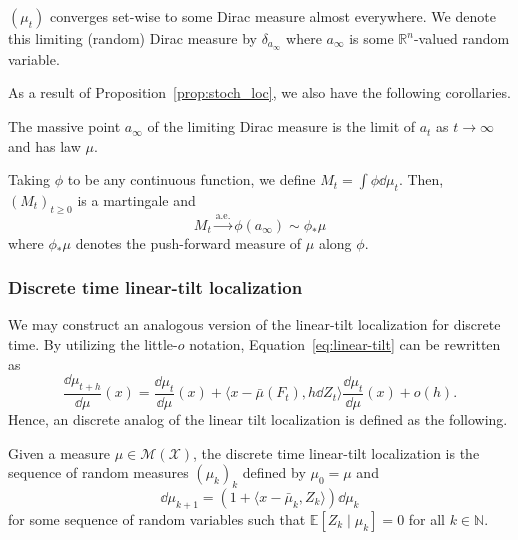 \begin{corollary}
  \((\mu_t)\) converges set-wise to some Dirac measure almost everywhere. We denote this 
  limiting (random) Dirac measure by \(\delta_{a_\infty}\) where \(a_\infty\) is some 
  \(\mathbb{R}^n\)-valued random variable.
\end{corollary}

As a result of Proposition~\ref{prop:stoch_loc}, we also have the following corollaries.

\begin{corollary}\label{cor:lim_dis}
  The massive point \(a_\infty\) of the limiting Dirac measure is the limit of \(a_t\) as 
  \(t \to \infty\) and has law \(\mu\).
\end{corollary}

\begin{corollary}\label{cor:lim_mart}
  Taking \(\phi\) to be any continuous function, we define \(M_t = \int \phi \dd\mu_t\). Then,
  \((M_t)_{t \ge 0}\) is a martingale and
  \begin{equation}\label{eq:lim_mart}
    M_t \xrightarrow{\text{a.e.}} \phi(a_\infty) \sim \phi_* \mu
  \end{equation}
  where \(\phi_*\mu\) denotes the push-forward measure of \(\mu\) along \(\phi\).
\end{corollary}

\subsubsection{Discrete time linear-tilt localization}\label{sec:discrete_tilt}

We may construct an analogous version of the linear-tilt localization for discrete time. By utilizing 
the little-\(o\) notation, Equation~\eqref{eq:linear-tilt} can be rewritten as 
\[\frac{\dd \mu_{t + h}}{\dd \mu}(x) = 
  \frac{\dd \mu_t}{\dd \mu}(x) + \langle x - \bar{\mu}(F_t), h\dd Z_t\rangle \frac{\dd \mu_t}{\dd \mu}(x) 
  + o(h).\]
Hence, an discrete analog of the linear tilt localization is defined as the following.

\begin{definition}
  Given a measure \(\mu \in \mathcal{M}(\mathcal{X})\), the discrete time linear-tilt localization 
  is the sequence of random measures \((\mu_k)_k\) defined by \(\mu_0 = \mu\) and 
  \begin{equation}\label{eq:discrete_tilt}
    \dd \mu_{k + 1} = (1 + \langle x - \bar{\mu}_k, Z_k \rangle)\dd \mu_k
  \end{equation} 
  for some sequence of random variables such that \(\mathbb{E}[Z_k \mid \mu_k] = 0\) for all 
  \(k \in \mathbb{N}\).
\end{definition}

